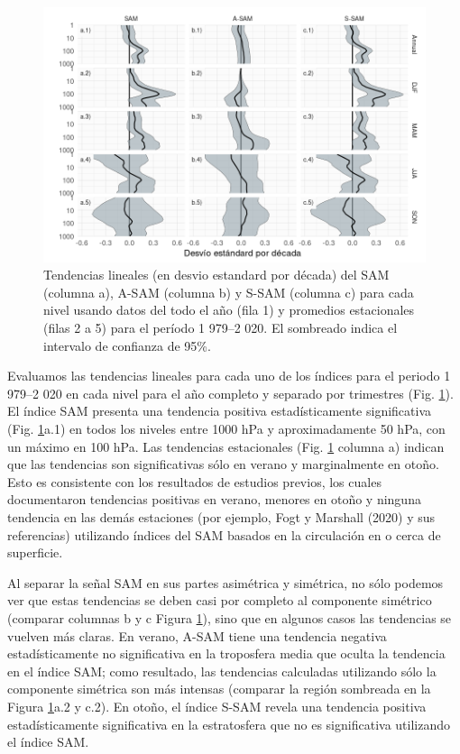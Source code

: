 \documentclass[12pt,oneside,a4paper]{reedthesis}
\begin{document}
\begin{figure}

{\centering \includegraphics{figures/30-sam/trends-1} 

}

\caption{Tendencias lineales (en desvio estandard por década) del SAM (columna a), A-SAM (columna b) y S-SAM (columna c) para cada nivel usando datos del todo el año (fila 1) y promedios estacionales (filas 2 a 5) para el período 1 979--2 020. El sombreado indica el intervalo de confianza de 95\%.}\label{fig:trends}
\end{figure}

Evaluamos las tendencias lineales para cada uno de los índices para el periodo 1 979--2 020 en cada nivel para el año completo y separado por trimestres (Fig. \ref{fig:trends}).
El índice SAM presenta una tendencia positiva estadísticamente significativa (Fig. \ref{fig:trends}a.1) en todos los niveles entre 1000 hPa y aproximadamente 50 hPa, con un máximo en 100 hPa.
Las tendencias estacionales (Fig. \ref{fig:trends} columna a) indican que las tendencias son significativas sólo en verano y marginalmente en otoño.
Esto es consistente con los resultados de estudios previos, los cuales documentaron tendencias positivas en verano, menores en otoño y ninguna tendencia en las demás estaciones (por ejemplo, Fogt y Marshall (2020) y sus referencias) utilizando índices del SAM basados en la circulación en o cerca de superficie.

Al separar la señal SAM en sus partes asimétrica y simétrica, no sólo podemos ver que estas tendencias se deben casi por completo al componente simétrico (comparar columnas b y c Figura \ref{fig:trends}), sino que en algunos casos las tendencias se vuelven más claras.
En verano, A-SAM tiene una tendencia negativa estadísticamente no significativa en la troposfera media que oculta la tendencia en el índice SAM; como resultado, las tendencias calculadas utilizando sólo la componente simétrica son más intensas (comparar la región sombreada en la Figura \ref{fig:trends}a.2 y c.2).
En otoño, el índice S-SAM revela una tendencia positiva estadísticamente significativa en la estratosfera que no es significativa utilizando el índice SAM.
\end{document}
